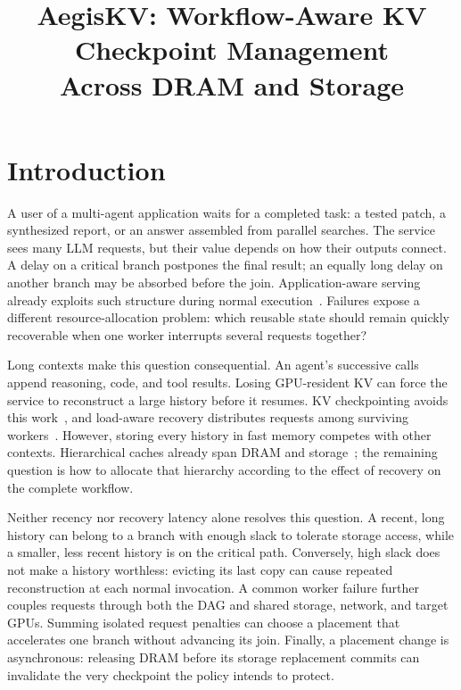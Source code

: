 \documentclass[sigplan,10pt,anonymous,nonacm]{acmart}
\title{AegisKV: Workflow-Aware KV Checkpoint Management\texorpdfstring{\\}{ }Across DRAM and Storage}
\begin{document}
\pagestyle{aegispreview}

\maketitle
\thispagestyle{aegispreview}
\raggedbottom

\section{Introduction}
\label{sec:introduction}

A user of a multi-agent application waits for a completed task: a tested
patch, a synthesized report, or an answer assembled from parallel searches.
The service sees many LLM requests, but their value depends on how their
outputs connect. A delay on a critical branch postpones the final result;
an equally long delay on another branch may be absorbed before the join.
Application-aware serving already exploits such structure during normal
execution~\cite{lin2024parrot,pan2025kvflow,ni2026topas}. Failures expose a
different resource-allocation problem: which reusable state should remain
quickly recoverable when one worker interrupts several requests together?

Long contexts make this question consequential. An agent's successive
calls append reasoning, code, and tool results. Losing GPU-resident KV
can force the service to reconstruct a large history before it resumes.
KV checkpointing avoids this work~\cite{strati2024dejavu,jayakody2026ghostserve},
and load-aware recovery distributes requests among surviving
workers~\cite{cao2026lumen}. However, storing every history in fast memory
competes with other contexts. Hierarchical caches already span DRAM and
storage~\cite{qin2025mooncake,xie2026strata}; the remaining question is how
to allocate that hierarchy according to the effect of recovery on the
complete workflow.

Neither recency nor recovery latency alone resolves this question. A
recent, long history can belong to a branch with enough slack to tolerate
storage access, while a smaller, less recent history is on the critical
path. Conversely, high slack does not make a history worthless: evicting
its last copy can cause repeated reconstruction at each normal invocation.
A common worker failure further couples requests through both the DAG and
shared storage, network, and target GPUs. Summing isolated request penalties
can choose a placement that accelerates one branch without advancing its
join. Finally, a placement change is asynchronous: releasing DRAM before
its storage replacement commits can invalidate the very checkpoint the
policy intends to protect.
\end{document}

